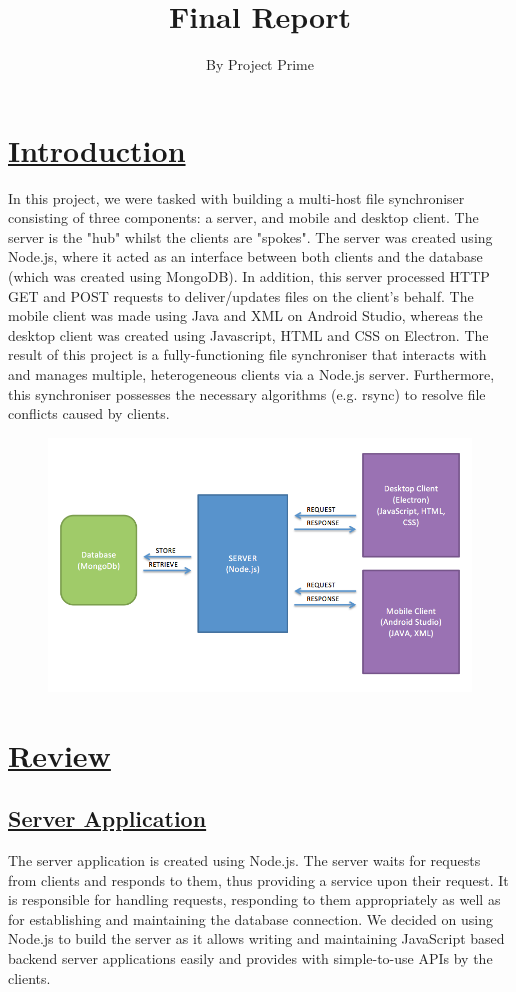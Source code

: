 \documentclass{article}
\title{Final Report}
\author{By Project Prime}
\begin{document}
\maketitle
 \section{\underline{Introduction}}
In this project, we were tasked with building a multi-host file synchroniser consisting of three components: a server, and mobile and desktop client. The server is the "hub" whilst the clients are "spokes". The server was created using Node.js, where it acted as an interface between both clients and the database (which was created using MongoDB). In addition, this server processed HTTP GET and POST requests to deliver/updates files on the client's behalf. The mobile client was made using Java and XML on Android Studio, whereas the desktop client was created using Javascript, HTML and CSS on Electron. The result of this project is a fully-functioning file synchroniser that interacts with and manages multiple, heterogeneous clients via a Node.js server. Furthermore, this synchroniser possesses the necessary algorithms (e.g. rsync) to resolve file conflicts caused by clients.
\begin{figure}[h!]
\includegraphics[width=\linewidth]{serverpic.png}
\end{figure}
\section{\underline{Review}}
\subsection{\underline{Server Application}}
The server application is created using Node.js. The server waits for requests from clients and responds to them, thus providing a service upon their request. It is responsible for handling requests, responding to them appropriately as well as for establishing and maintaining the database connection.  We decided on using Node.js to build the server as it allows writing and maintaining JavaScript based backend server applications easily and provides with simple-to-use APIs by the clients.
\end{document}
